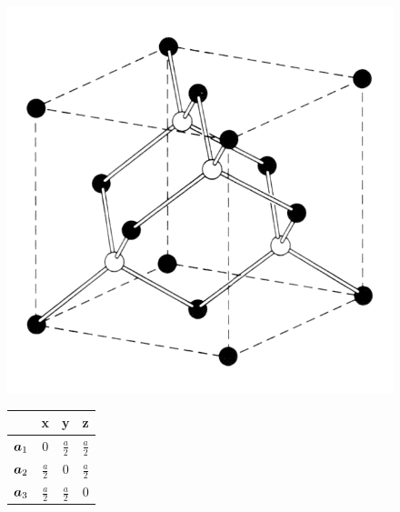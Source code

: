  	\begin{figure}[tbp]
		\begin{minipage}[c]{.38\linewidth}
			\centering
			\includegraphics[width=.9\linewidth]{andere_bilder/diamond.png}
		\end{minipage}
		\hfill
		\begin{minipage}[c]{.25\linewidth}
			\centering
			\begin{tabular}{c c c c} 
				\hline
				& \textbf{x} & \textbf{y} & \textbf{z}\\ 
				\hline 
				\vspace{0.2cm} 
				$\boldsymbol{a}_1$ & 0 & $\frac{a}{2}$ & $\frac{a}{2}$ \\
				\vspace{0.2cm}
				$\boldsymbol{a}_2$ & $\frac{a}{2}$ & 0 & $\frac{a}{2}$ \\
				\vspace{0.2cm}
				$\boldsymbol{a}_3$ & $\frac{a}{2}$ & $\frac{a}{2}$ & 0 
			\end{tabular}	
		\end{minipage}
		\hfill
		\begin{minipage}[c]{.33\linewidth}

\end{minipage}
\end{figure}
